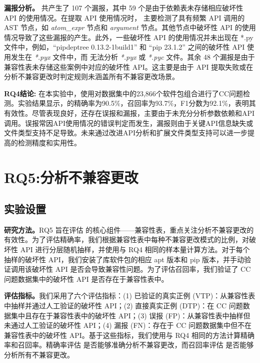 \textbf{漏报分析。}\tool{} 共产生了 107 个漏报，其中 59 个是由于依赖表未存储相应破坏性 API 的使用情况。在提取 API 使用情况时，\tool{} 主要检测了具有频繁 API 调用的 AST 节点，如 \textit{atom\_expr} 节点和 \textit{argument} 节点。其他节点中破坏性 API 的使用情况导致了这些漏报的产生。此外，一些破坏性 API 的使用情况并未出现在 *.py 文件中，例如，“pipdeptree 0.13.2-1build1”  和 “pip 23.1.2”  之间的破坏性 API 使用发生在 \textit{*.pyx} 文件中，而 \tool{} 无法分析 \textit{*.pyx} 或 \textit{*.pyc} 文件。其余 48 个漏报是由于兼容性表未存储这些案例中对应的破坏性 API。这主要是由于 API 提取失败或在分析不兼容更改时判定规则未涵盖所有不兼容更改场景。

\begin{tcolorbox}[boxrule=1pt,boxsep=1pt,left=2pt,right=2pt,top=2pt,bottom=2pt]
	\small
	\textcolor{red}{} \noindent\textbf{RQ4结论:} 
	在本实验中，使用\tool{}对数据集中的23,866个软件包组合进行了CC问题检测。实验结果显示，\tool{}的精确率为90.5\%，召回率为93.7\%，F1分数为92.1\%，表明其有效性。尽管表现良好，\tool{}还存在误报和漏报，主要由于未充分分析参数依赖和API调用。误报常因API使用情况的错误判定而发生，漏报则由于关键API信息缺失或文件类型支持不足导致。未来通过改进API分析和扩展文件类型支持可以进一步提高\tool{}的检测精度和实用性。
\end{tcolorbox} 

\section{RQ5:分析不兼容更改}
\subsection{实验设置}
\textbf{研究方法。}RQ5 旨在评估 \tool{} 的核心组件——兼容性表，重点关注分析不兼容更改的有效性。为了评估精确率，我们根据兼容性表中每种不兼容更改模式的比例，对破坏性 API 进行分层随机抽样，并使用与 RQ4 相同的样本量计算方法。对于每个抽样的破坏性 API，我们安装了库软件包的相应 apt 版本和 pip 版本，并手动验证调用该破坏性 API 是否会导致兼容性问题。为了评估召回率，我们验证了 CC 问题数据集中的破坏性 API 是否存在于兼容性表中。

\textbf{评估指标。}我们采用了六个评估指标：(1) 已验证的真实正例 (VTP)：从兼容性表中抽样并通过人工验证的破坏性 API；(2) 直接真实正例 (DTP)：在 CC 问题数据集中且存在于兼容性表中的破坏性 API；(3) 误报 (FP)：从兼容性表中抽样但未通过人工验证的破坏性 API；(4) 漏报 (FN)：存在于 CC 问题数据集中但不在兼容性表中的破坏性 API。基于这些指标，我们使用与 RQ4 相同的方法计算精确率和召回率。精确率评估 \tool{} 是否能够准确分析不兼容更改，而召回率评估 \tool{} 是否能够分析所有不兼容更改。
